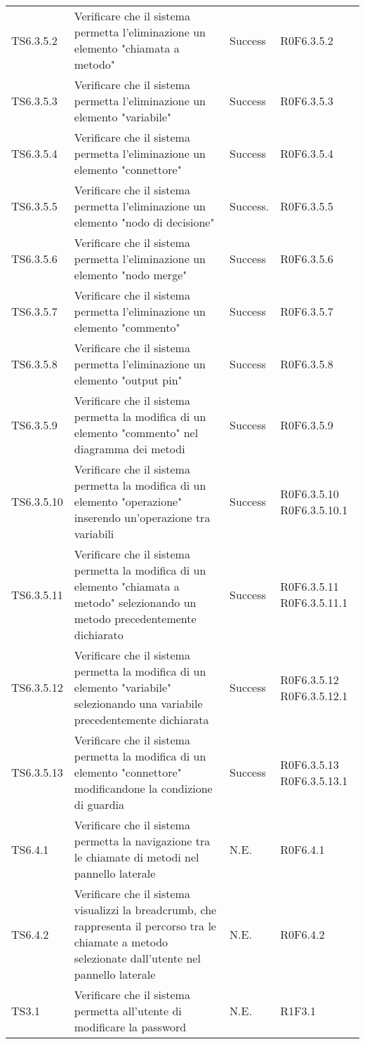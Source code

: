 \begin{longtable}{p{2.5cm}!{\VRule[1pt]}p{6.5cm}!{\VRule[1pt]}p{1cm}!{\VRule[1pt]}p{3cm}}
TS6.3.5.2 & Verificare che il sistema permetta l'eliminazione un elemento "chiamata a metodo" & Success& R0F6.3.5.2\\
TS6.3.5.3 & Verificare che il sistema permetta l'eliminazione un elemento "variabile" & Success & R0F6.3.5.3\\
TS6.3.5.4 & Verificare che il sistema permetta l'eliminazione un elemento "connettore" & Success & R0F6.3.5.4\\
TS6.3.5.5 & Verificare che il sistema permetta l'eliminazione un elemento "nodo di decisione" & Success. & R0F6.3.5.5\\
TS6.3.5.6 & Verificare che il sistema permetta l'eliminazione un elemento "nodo merge" & Success & R0F6.3.5.6\\
TS6.3.5.7 & Verificare che il sistema permetta l'eliminazione un elemento "commento" & Success & R0F6.3.5.7\\
TS6.3.5.8 & Verificare che il sistema permetta l'eliminazione un elemento "output pin" & Success & R0F6.3.5.8\\
TS6.3.5.9 & Verificare che il sistema permetta la modifica di un elemento "commento" nel diagramma dei metodi & Success & R0F6.3.5.9\\
TS6.3.5.10 & Verificare che il sistema permetta la modifica di un elemento "operazione" inserendo un'operazione tra variabili & Success & R0F6.3.5.10 R0F6.3.5.10.1\\
TS6.3.5.11 & Verificare che il sistema permetta la modifica di un elemento "chiamata a metodo" selezionando un metodo precedentemente dichiarato & Success & R0F6.3.5.11 R0F6.3.5.11.1\\
TS6.3.5.12 & Verificare che il sistema permetta la modifica di un elemento "variabile" selezionando una variabile precedentemente dichiarata & Success & R0F6.3.5.12 R0F6.3.5.12.1\\
TS6.3.5.13 & Verificare che il sistema permetta la modifica di un elemento "connettore" modificandone la condizione di guardia & Success & R0F6.3.5.13 R0F6.3.5.13.1\\
TS6.4.1 & Verificare che il sistema permetta la navigazione tra le chiamate di metodi nel pannello laterale & N.E. & R0F6.4.1\\
TS6.4.2 & Verificare che il sistema visualizzi la breadcrumb, che rappresenta il percorso tra le chiamate a metodo selezionate dall'utente nel pannello laterale & N.E. & R0F6.4.2\\
TS3.1 & Verificare che il sistema permetta all'utente di modificare la password & N.E. & R1F3.1 \\

\end{longtable}
